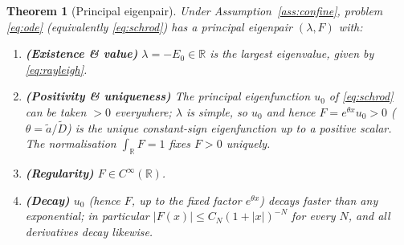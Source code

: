 \documentclass{amsart}
\newtheorem{theorem}{Theorem}
\theoremstyle{definition}
\newcommand{\R}{\mathbb{R}}
\begin{document}
\begin{theorem}[Principal eigenpair]\label{thm:principal}
Under Assumption~\ref{ass:confine}, problem \eqref{eq:ode} (equivalently \eqref{eq:schrod})
has a \emph{principal eigenpair} $(\lambda,F)$ with:
\begin{enumerate}
\item[\rm(i)] \textbf{(Existence \& value)} $\lambda=-E_0\in\R$ is the largest eigenvalue, given by \eqref{eq:rayleigh}.
\item[\rm(ii)] \textbf{(Positivity \& uniqueness)} The principal eigenfunction $u_0$ of
\eqref{eq:schrod} can be taken $>0$ everywhere; $\lambda$ is simple, so $u_0$ and hence
$F=e^{\theta x}u_0>0$ ($\theta=\widetilde a/\widetilde D$) is the \emph{unique} constant-sign
eigenfunction up to a positive scalar. The normalisation $\int_\R F=1$ fixes $F>0$ uniquely.
\item[\rm(iii)] \textbf{(Regularity)} $F\in C^\infty(\R)$.
\item[\rm(iv)] \textbf{(Decay)} $u_0$ (hence $F$, up to the fixed factor $e^{\theta x}$) decays
faster than any exponential; in particular $|F(x)|\le C_N(1+|x|)^{-N}$ for every $N$, and all
derivatives decay likewise.
\end{enumerate}
\end{theorem}
\end{document}
